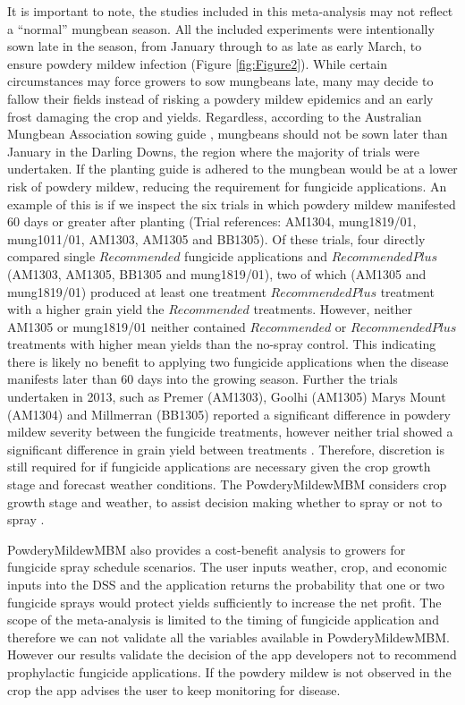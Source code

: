 \documentclass[agronomy,article,submit,moreauthors,pdftex]{mdpi}
\begin{document}
It is important to note, the studies included in this meta-analysis may not reflect a ``normal'' mungbean season.
All the included experiments were intentionally sown late in the season, from January through to as late as early March, to ensure powdery mildew infection (Figure \ref{fig:Figure2}).
While certain circumstances may force growers to sow mungbeans late, many may decide to fallow their fields instead of risking a powdery mildew epidemics and an early frost damaging the crop and yields.
Regardless, according to the Australian Mungbean Association sowing guide \citep{AMAplanting}, mungbeans should not be sown later than January in the Darling Downs, the region where the majority of trials were undertaken.
If the planting guide is adhered to the mungbean would be at a lower risk of powdery mildew, reducing the requirement for fungicide applications.
An example of this is if we inspect the six trials in which powdery mildew manifested 60 days or greater after planting (Trial references: AM1304, mung1819/01, mung1011/01, AM1303, AM1305 and BB1305).
Of these trials, four directly compared single \(Recommended\) fungicide applications and \(RecommendedPlus\) (AM1303, AM1305, BB1305 and mung1819/01), two of which (AM1305 and mung1819/01) produced at least one treatment \(RecommendedPlus\) treatment with a higher grain yield the \(Recommended\) treatments.
However, neither AM1305 or mung1819/01 neither contained \(Recommended\) or \(RecommendedPlus\) treatments with higher mean yields than the no-spray control.
This indicating there is likely no benefit to applying two fungicide applications when the disease manifests later than 60 days into the growing season.
Further the trials undertaken in 2013, such as Premer (AM1303), Goolhi (AM1305) Marys Mount (AM1304) and Millmerran (BB1305) reported a significant difference in powdery mildew severity between the fungicide treatments, however neither trial showed a significant difference in grain yield between treatments \citep[\citet{premer2013}, \citet{Marysmount2013}, \citet{goolhi2013}]{Millmerran2013}.
Therefore, discretion is still required for if fungicide applications are necessary given the crop growth stage and forecast weather conditions.
The PowderyMildewMBM considers crop growth stage and weather, to assist decision making whether to spray or not to spray \citep{Diggle}.

PowderyMildewMBM also provides a cost-benefit analysis to growers for fungicide spray schedule scenarios.
The user inputs weather, crop, and economic inputs into the DSS and the application returns the probability that one or two fungicide sprays would protect yields sufficiently to increase the net profit.
The scope of the meta-analysis is limited to the timing of fungicide application and therefore we can not validate all the variables available in PowderyMildewMBM.
However our results validate the decision of the app developers not to recommend prophylactic fungicide applications.
If the powdery mildew is not observed in the crop the app advises the user to keep monitoring for disease.\\
\end{document}
